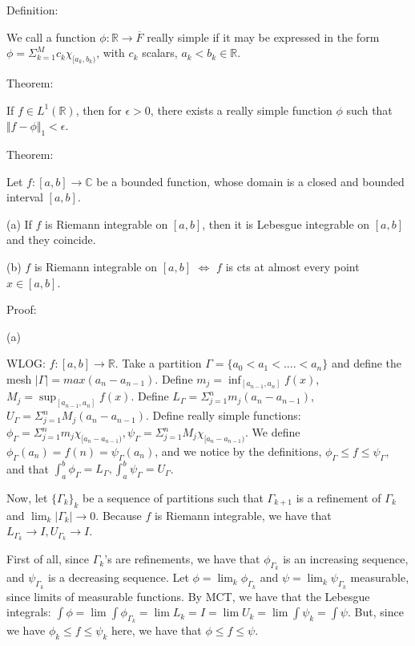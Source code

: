 \documentclass[10pt]{article}
\begin{document}
Definition:

We call a function $\phi: \mathbb{R} \to \overline{F}$ really simple if it may be expressed in the form $\phi = \Sigma_{k=1}^M c_k \chi_{[a_k,b_k)}$, with $c_k$ scalars, $a_k < b_k \in \mathbb{R}$.

Theorem:

If $f \in L^1(\mathbb{R})$, then for $\epsilon > 0$, there exists a really simple function $\phi$ such that $\Vert f - \phi \Vert_1 < \epsilon$.

Theorem:

Let $f : [a,b] \to \mathbb{C}$ be a bounded function, whose domain is a closed and bounded interval $[a,b]$.

(a) If $f$ is Riemann integrable on $[a,b]$, then it is Lebesgue integrable on $[a,b]$ and they coincide.

(b) $f$ is Riemann integrable on $[a,b]$ $\iff$ $f$ is cts at almost every point $x \in [a,b]$.

Proof:

(a)

WLOG: $f: [a,b] \to \mathbb{R}$. Take a partition $\Gamma =  \{a_0 < a_1 < .... < a_n \}$ and define the mesh $|\Gamma| = max(a_n - a_{n-1})$. Define $m_j = \inf_{[a_{n-1},a_n]} f(x)$, $M_j = \sup_{[a_{n-1},a_n]} f(x)$. Define $L_\Gamma = \Sigma_{j=1}^n m_j(a_n - a_{n-1})$, $U_\Gamma = \Sigma_{j=1}^n M_j(a_n - a_{n-1})$. Define really simple functions: $\phi_\Gamma = \Sigma_{j=1}^n m_j \chi_{[a_n - a_{n-1})}, \psi_\Gamma = \Sigma_{j=1}^n M_j \chi_{[a_n - a_{n-1})}$. We define $\phi_\Gamma(a_n) = f(n) = \psi_\Gamma(a_n)$, and we notice by the definitions, $\phi_\Gamma \leq f \leq \psi_\Gamma$, and that $\int_a^b \phi_\Gamma = L_\Gamma, \int_a^b \psi_\Gamma = U_\Gamma$.

Now, let $\{ \Gamma_k \}_k$ be a sequence of partitions such that $\Gamma_{k+1}$ is a refinement of $\Gamma_{k}$ and $\lim_k |\Gamma_k| \to 0$. Because $f$ is Riemann integrable, we have that $L_{\Gamma_k} \to I, U_{\Gamma_k} \to I$.

First of all, since $\Gamma_k$’s are refinements, we have that $\phi_{\Gamma_k}$ is an increasing sequence, and $\psi_{\Gamma_k}$ is a decreasing sequence. Let $\phi = \lim_k \phi_{\Gamma_k}$ and $\psi = \lim_k \psi_{\Gamma_k}$ measurable, since limits of measurable functions. By MCT, we have that the Lebesgue integrals: $\int \phi = \lim \int \phi_{\Gamma_k} = \lim L_k = I = \lim U_k = \lim \int \psi_k = \int \psi$. But, since we have $\phi_k \leq f \leq \psi_k$ here, we have that $\phi \leq f \leq \psi$. 
\end{document}
